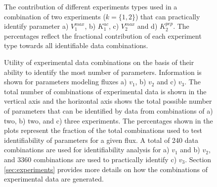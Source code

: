 \documentclass[10pt]{article}
\begin{document}
	\begin{figure}[!tbhp]
		\caption{The contribution of different experiments types used in a combination of two experiments ($k = \{1, 2\}$) that can practically identify parameter a) $V_1^{max}$, b) $K_1^{ac}$, c) $V_2^{max}$ and d) $K_2^{pep}$. The percentages reflect the fractional contribution of each experiment type towards all identifiable data combinations.}\label{fig:exp_info}
	\end{figure} 

	\begin{figure}[!tbhp]
		\caption{Utility of experimental data combinations on the basis of their ability to identify the most number of parameters. Information is shown for parameters modeling fluxes a) $v_1$, b) $v_2$ and c) $v_3$. The total number of combinations of experimental data is shown in the vertical axis and the horizontal axis shows the total possible number of parameters that can be identified by data from combinations of a) two, b) two, and c) three experiments. The percentages shown in the plots represent the fraction of the total combinations used to test identifiability of parameters for a given flux. A total of 240 data combinations are used for identifiability analysis for a) $v_1$ and b) $v_2$, and 3360 combinations are used to practically identify c) $v_3$. Section \ref{sec:experiments} provides more details on how the combinations of experimental data are generated.}\label{fig:data_utility}
	\end{figure}
	
\end{document}
